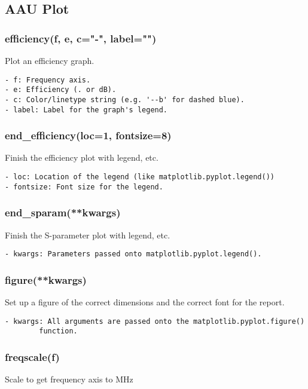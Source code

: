 \subsection{AAU Plot}
\subsubsection{efficiency(f, e, c="-", label="")}
Plot an efficiency graph.

\begin{verbatim}
- f: Frequency axis.
- e: Efficiency (. or dB).
- c: Color/linetype string (e.g. '--b' for dashed blue).
- label: Label for the graph's legend.
\end{verbatim}

\subsubsection{end\_efficiency(loc=1, fontsize=8)}
Finish the efficiency plot with legend, etc.

\begin{verbatim}
- loc: Location of the legend (like matplotlib.pyplot.legend())
- fontsize: Font size for the legend.
\end{verbatim}

\subsubsection{end\_sparam(**kwargs)}
Finish the S-parameter plot with legend, etc.

\begin{verbatim}
- kwargs: Parameters passed onto matplotlib.pyplot.legend().
\end{verbatim}

\subsubsection{figure(**kwargs)}
Set up a figure of the correct dimensions and the correct font for the
report.

\begin{verbatim}
- kwargs: All arguments are passed onto the matplotlib.pyplot.figure()
        function.
\end{verbatim}

\subsubsection{freqscale(f)}
Scale to get frequency axis to MHz

